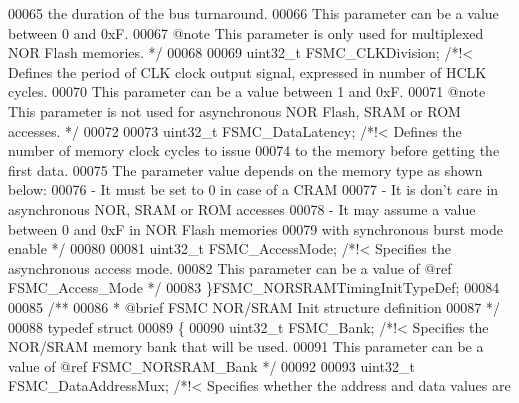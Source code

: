 \begin{DoxyCode}
00065 \textcolor{comment}{                                             the duration of the bus turnaround.}
00066 \textcolor{comment}{                                             This parameter can be a value between 0 and 0xF.}
00067 \textcolor{comment}{                                             @note This parameter is only used for multiplexed NOR
       Flash memories. */}
00068 
00069   uint32\_t FSMC_CLKDivision;            \textcolor{comment}{/*!< Defines the period of CLK clock output signal, expressed
       in number of HCLK cycles.}
00070 \textcolor{comment}{                                             This parameter can be a value between 1 and 0xF.}
00071 \textcolor{comment}{                                             @note This parameter is not used for asynchronous NOR
       Flash, SRAM or ROM accesses. */}
00072 
00073   uint32\_t FSMC_DataLatency;            \textcolor{comment}{/*!< Defines the number of memory clock cycles to issue}
00074 \textcolor{comment}{                                             to the memory before getting the first data.}
00075 \textcolor{comment}{                                             The parameter value depends on the memory type as shown
       below:}
00076 \textcolor{comment}{                                              - It must be set to 0 in case of a CRAM}
00077 \textcolor{comment}{                                              - It is don't care in asynchronous NOR, SRAM or ROM
       accesses}
00078 \textcolor{comment}{                                              - It may assume a value between 0 and 0xF in NOR Flash
       memories}
00079 \textcolor{comment}{                                                with synchronous burst mode enable */}
00080 
00081   uint32\_t FSMC_AccessMode;             \textcolor{comment}{/*!< Specifies the asynchronous access mode. }
00082 \textcolor{comment}{                                             This parameter can be a value of @ref FSMC\_Access\_Mode */}
00083 \}FSMC\_NORSRAMTimingInitTypeDef;
00084 
00085 \textcolor{comment}{/** }
00086 \textcolor{comment}{  * @brief  FSMC NOR/SRAM Init structure definition}
00087 \textcolor{comment}{  */}
00088 \textcolor{keyword}{typedef} \textcolor{keyword}{struct}
00089 \{
00090   uint32\_t FSMC_Bank;                \textcolor{comment}{/*!< Specifies the NOR/SRAM memory bank that will be used.}
00091 \textcolor{comment}{                                          This parameter can be a value of @ref FSMC\_NORSRAM\_Bank */}
00092 
00093   uint32\_t FSMC_DataAddressMux;      \textcolor{comment}{/*!< Specifies whether the address and data values are}

\end{DoxyCode}
